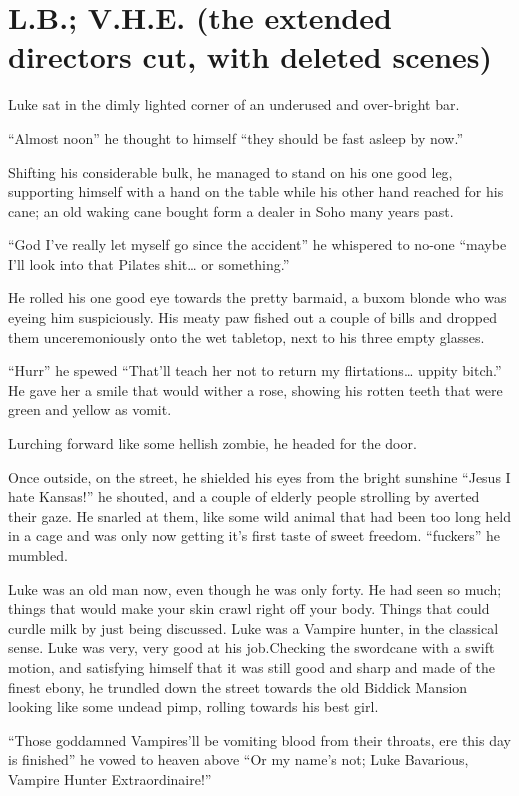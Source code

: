 \chapter[L.B.; V.H.E.]{L.B.; V.H.E. (the extended directors cut, with deleted scenes)}


Luke sat in the dimly lighted corner of an underused and
over-bright bar.

``Almost noon'' he thought to himself ``they should be fast asleep by
now.''

Shifting his considerable bulk, he managed to stand on his one good
leg, supporting himself with a hand on the table while his other
hand reached for his cane; an old waking cane bought form a dealer
in Soho many years past.

``God I've really let myself go since the accident'' he whispered to
no-one ``maybe I'll look into that Pilates shit{\ldots} or
something.''

He rolled his one good eye towards the pretty barmaid, a buxom
blonde who was eyeing him suspiciously. His meaty paw fished out a
couple of bills and dropped them unceremoniously onto the wet
tabletop, next to his three empty glasses.

``Hurr'' he spewed ``That'll teach her not to return my
flirtations{\ldots} uppity bitch.'' He gave her a smile that would wither
a rose, showing his rotten teeth that were green and yellow as
vomit.

Lurching forward like some hellish zombie, he headed for the
door.

Once outside, on the street, he shielded his eyes from the bright
sunshine ``Jesus I hate Kansas!'' he shouted, and a couple of elderly
people strolling by averted their gaze. He snarled at them, like
some wild animal that had been too long held in a cage and was only
now getting it's first taste of sweet freedom. ``fuckers'' he
mumbled.

Luke was an old man now, even though he was only forty. He had seen
so much; things that would make your skin crawl right off your
body. Things that could curdle milk by just being discussed. Luke
was a Vampire hunter, in the classical sense. Luke was very, very
good at his job.Checking the swordcane with a swift motion, and
satisfying himself that it was still good and sharp and made of the
finest ebony, he trundled down the street towards the old Biddick
Mansion looking like some undead pimp, rolling towards his best
girl.

``Those goddamned Vampires'll be vomiting blood from their throats,
ere this day is finished'' he vowed to heaven above ``Or my name's
not; Luke Bavarious, Vampire Hunter Extraordinaire!''


